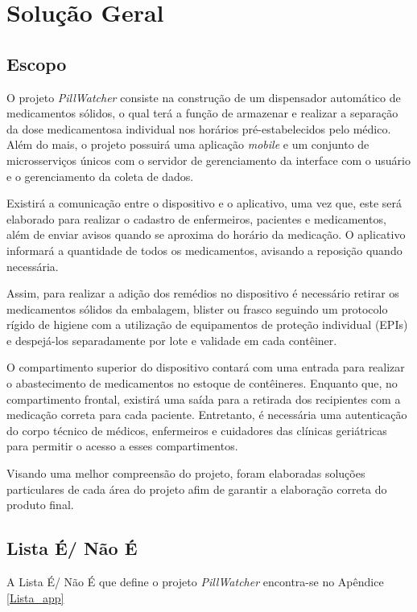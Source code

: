 \chapter[Solução Geral]{Solução Geral}
\section{Escopo}
O projeto \textit{PillWatcher} consiste na construção de um dispensador automático de medicamentos sólidos, o qual terá a função de armazenar e realizar a separação da dose medicamentosa individual nos horários pré-estabelecidos pelo médico. Além do mais, o projeto possuirá uma aplicação \textit{mobile} e um conjunto de microsserviços únicos com o servidor de gerenciamento da interface com o usuário e o gerenciamento da coleta de dados.

Existirá a comunicação entre o dispositivo e o aplicativo, uma vez que, este será elaborado para realizar o cadastro de enfermeiros, pacientes e medicamentos, além de enviar avisos quando se aproxima do horário da medicação. O aplicativo informará a quantidade de todos os medicamentos, avisando a reposição quando necessária.

Assim, para realizar a adição dos remédios no dispositivo é necessário retirar os medicamentos sólidos da embalagem, blister ou frasco seguindo um protocolo rígido de higiene com a utilização de equipamentos de proteção individual (EPIs) e despejá-los separadamente por lote e validade em cada contêiner.

O compartimento superior do dispositivo contará com uma entrada para realizar o abastecimento de medicamentos no estoque de contêineres. Enquanto que, no compartimento frontal, existirá uma saída para a retirada dos recipientes com a medicação correta para cada paciente. Entretanto, é necessária uma autenticação do corpo técnico de médicos, enfermeiros e cuidadores das clínicas geriátricas para permitir o acesso a esses compartimentos.

Visando uma melhor compreensão do projeto, foram elaboradas soluções particulares de cada área do projeto afim de garantir a elaboração correta do produto final.

\section{Lista É/ Não É}
A Lista É/ Não É que define o projeto \textit{PillWatcher} encontra-se no Apêndice \ref{Lista_app}

